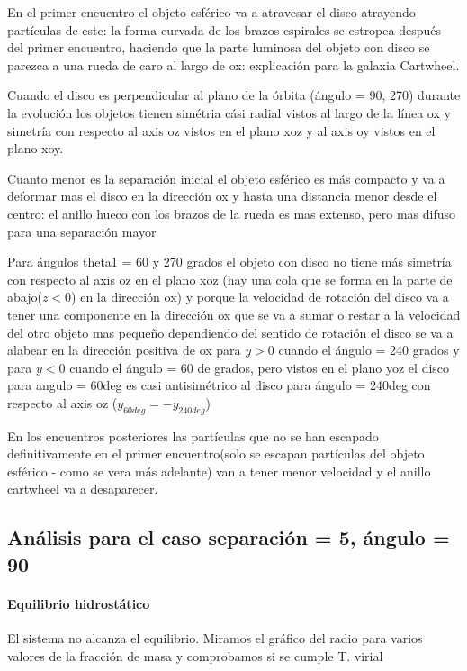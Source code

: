\documentclass[12pt]{article} %
\renewcommand{\=}[1]{\stackrel{#1}{=}} %
\theoremstyle{definition}
\theoremstyle{remark}
\begin{document}
\clearpage
\newpage

En el primer encuentro el objeto esférico va a atravesar el disco atrayendo partículas de este:
la forma curvada de los brazos espirales se estropea después del primer encuentro, 
haciendo que la parte luminosa del objeto con disco se parezca a una rueda de caro al largo de ox: explicación para la galaxia Cartwheel. 

Cuando el disco es perpendicular al plano de la órbita (ángulo = 90, 270) 
durante la evolución los objetos tienen simétria cási radial vistos al largo de la línea ox y simetría con respecto al axis oz vistos en el plano xoz y al axis oy vistos en el plano xoy.

Cuanto menor es la separación inicial el objeto esférico es más compacto y va a deformar mas el disco en la dirección ox y hasta una distancia menor desde el centro: el anillo hueco con los brazos de la rueda es mas extenso, pero mas difuso para una separación mayor

Para ángulos theta1 = 60 y 270 grados el objeto con disco no tiene más simetría con respecto al axis oz en el plano xoz
(hay una cola que se forma en la parte de abajo($z<0$) en la dirección ox) 
y porque la velocidad de rotación del disco va a tener una componente en la dirección ox que se va a sumar o restar a la 
velocidad del otro objeto mas pequeño dependiendo del sentido de rotación el disco se va a alabear en la dirección 
positiva de ox para $y > 0$ cuando el ángulo = 240 grados  y para $y<0$ cuando el ángulo = 60 de grados,
pero vistos en el plano yoz el disco para angulo = 60deg es casi 
antisimétrico al disco para ángulo = 240deg con respecto al axis oz ($y_{60deg} = -y_{240deg} $)

En los encuentros posteriores las partículas que no se han escapado definitivamente  en el primer encuentro(solo se escapan partículas del objeto esférico - como se vera más adelante) van a tener menor velocidad y el anillo cartwheel va a desaparecer. 


\subsection*{Análisis para el caso separación = 5, ángulo = 90}


\paragraph{Equilibrio hidrostático}
El sistema no alcanza el equilibrio. Miramos el gráfico del radio para varios valores de la fracción de masa y comprobamos si se cumple T. virial
\end{document}
